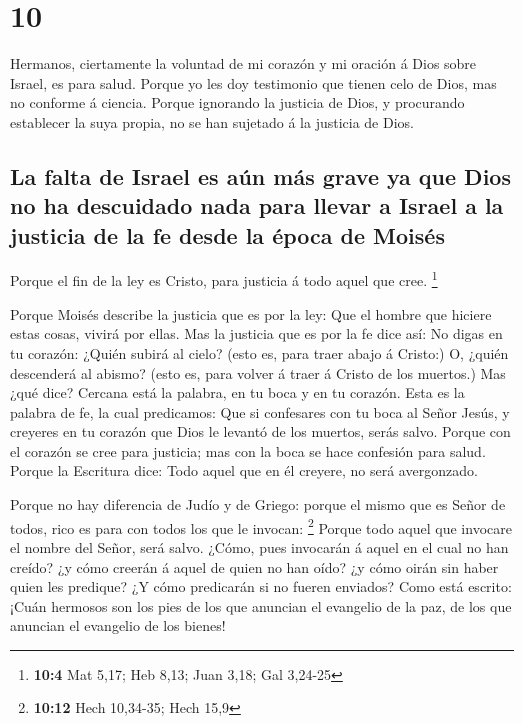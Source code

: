 \hypertarget{section-9}{%
\section{10}\label{section-9}}

 Hermanos, ciertamente la voluntad de mi corazón y mi
oración á Dios sobre Israel, es para salud.  Porque yo les
doy testimonio que tienen celo de Dios, mas no conforme á ciencia.
 Porque ignorando la justicia de Dios, y procurando
establecer la suya propia, no se han sujetado á la justicia de Dios.

\hypertarget{la-falta-de-israel-es-auxfan-muxe1s-grave-ya-que-dios-no-ha-descuidado-nada-para-llevar-a-israel-a-la-justicia-de-la-fe-desde-la-uxe9poca-de-moisuxe9s}{%
\subsection{La falta de Israel es aún más grave ya que Dios no ha
descuidado nada para llevar a Israel a la justicia de la fe desde la
época de
Moisés}\label{la-falta-de-israel-es-auxfan-muxe1s-grave-ya-que-dios-no-ha-descuidado-nada-para-llevar-a-israel-a-la-justicia-de-la-fe-desde-la-uxe9poca-de-moisuxe9s}}

 Porque el fin de la ley es Cristo, para justicia á todo
aquel que cree. \footnote{\textbf{10:4} Mat 5,17; Heb 8,13; Juan 3,18;
  Gal 3,24-25}

 Porque Moisés describe la justicia que es por la ley: Que
el hombre que hiciere estas cosas, vivirá por ellas.  Mas
la justicia que es por la fe dice así: No digas en tu corazón: ¿Quién
subirá al cielo? (esto es, para traer abajo á Cristo:)  O,
¿quién descenderá al abismo? (esto es, para volver á traer á Cristo de
los muertos.)  Mas ¿qué dice? Cercana está la palabra, en
tu boca y en tu corazón. Esta es la palabra de fe, la cual predicamos:
 Que si confesares con tu boca al Señor Jesús, y creyeres
en tu corazón que Dios le levantó de los muertos, serás salvo.
 Porque con el corazón se cree para justicia; mas con la
boca se hace confesión para salud.  Porque la Escritura
dice: Todo aquel que en él creyere, no será avergonzado.

 Porque no hay diferencia de Judío y de Griego: porque el
mismo que es Señor de todos, rico es para con todos los que le invocan:
\footnote{\textbf{10:12} Hech 10,34-35; Hech 15,9} 
Porque todo aquel que invocare el nombre del Señor, será salvo.
 ¿Cómo, pues invocarán á aquel en el cual no han creído?
¿y cómo creerán á aquel de quien no han oído? ¿y cómo oirán sin haber
quien les predique?  ¿Y cómo predicarán si no fueren
enviados? Como está escrito: ¡Cuán hermosos son los pies de los que
anuncian el evangelio de la paz, de los que anuncian el evangelio de los
bienes!

